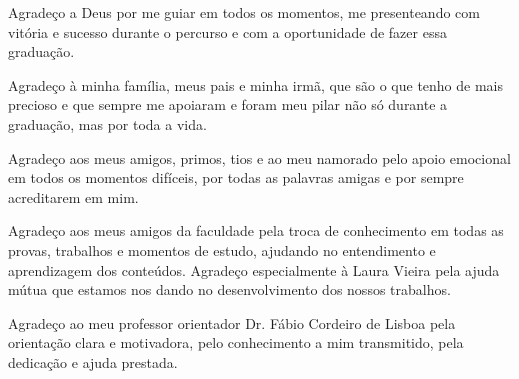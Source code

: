 \begin{agradecimentos}
Agradeço a Deus por me guiar em todos os momentos, me presenteando com vitória e sucesso durante o percurso e com a oportunidade de fazer essa graduação.

Agradeço à minha família, meus pais e minha irmã, que são o que tenho de mais precioso e que sempre me apoiaram e foram meu pilar não só durante a graduação, mas por toda a vida. 

Agradeço aos meus amigos, primos, tios e ao meu namorado pelo apoio emocional em todos os momentos difíceis, por todas as palavras amigas e por sempre acreditarem em mim.

Agradeço aos meus amigos da faculdade pela troca de conhecimento em todas as provas, trabalhos e momentos de estudo, ajudando no entendimento e aprendizagem dos conteúdos. Agradeço especialmente à Laura Vieira pela ajuda mútua que estamos nos dando no desenvolvimento dos nossos trabalhos. 

Agradeço ao meu professor orientador Dr. Fábio Cordeiro de Lisboa pela orientação clara e motivadora, pelo conhecimento a mim transmitido, pela dedicação e ajuda prestada.


\end{agradecimentos}
